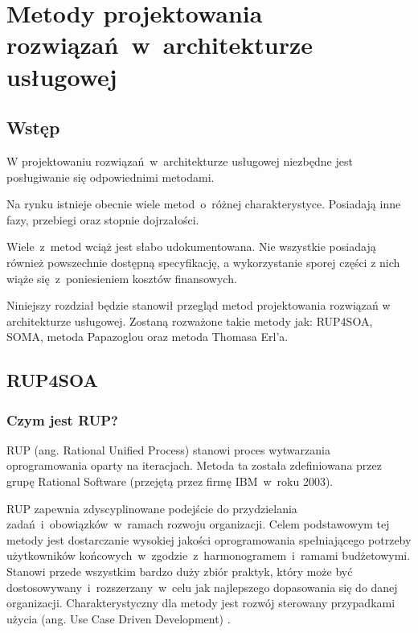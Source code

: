 \chapter{Metody projektowania rozwiązań~w~architekturze usługowej}

\section{Wstęp}
W projektowaniu rozwiązań~w~architekturze usługowej niezbędne jest posługiwanie się odpowiednimi metodami. 

Na rynku istnieje obecnie wiele metod~o~różnej charakterystyce. Posiadają inne fazy, przebiegi oraz stopnie dojrzałości. 

Wiele~z~metod wciąż jest słabo udokumentowana. Nie wszystkie posiadają również powszechnie dostępną specyfikację, a wykorzystanie sporej części z nich wiąże się~z~poniesieniem kosztów finansowych.

Niniejszy rozdział będzie stanowił przegląd metod projektowania rozwiązań w architekturze usługowej. Zostaną rozważone takie metody jak: RUP4SOA, SOMA, metoda Papazoglou oraz metoda Thomasa Erl'a. 

\section{RUP4SOA}
\subsection{Czym jest RUP?}
RUP (ang. Rational Unified Process) stanowi proces  wytwarzania oprogramowania oparty na iteracjach. Metoda ta została zdefiniowana przez grupę Rational Software (przejętą przez firmę IBM~w~roku 2003). 

RUP zapewnia zdyscyplinowane podejście do przydzielania zadań~i~obowiązków~w~ramach rozwoju organizacji. Celem podstawowym tej metody jest dostarczanie wysokiej jakości oprogramowania spełniającego potrzeby użytkowników końcowych~w~zgodzie~z~harmonogramem~i~ramami budżetowymi\cite{RUPIntRat}. Stanowi przede wszystkim bardzo duży zbiór praktyk, który może być dostosowywany~i~rozszerzany~w~celu jak najlepszego dopasowania się do danej organizacji. Charakterystyczny dla metody jest rozwój sterowany przypadkami użycia (ang. Use Case Driven Development) \cite{RUPMartFow}. 

